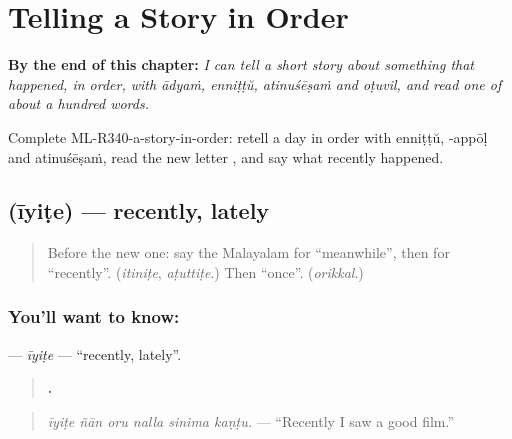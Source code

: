 
\chapter{Telling a Story in Order}
\label{ch:ml-telling-a-story-in-order}

\begin{chapteropening}
\textbf{By the end of this chapter:} \emph{I can tell a short story about something that happened, in order, with ādyaṁ, enniṭṭŭ, atinuśēṣaṁ and oṭuvil, and read one of about a hundred words.}

Complete ML-R340-a-story-in-order: retell a day in order with enniṭṭŭ, -appōḷ and atinuśēṣaṁ, read the new letter , and say what recently happened.
\end{chapteropening}

\section[\texorpdfstring{\ml{ഈയിടെ} (īyiṭe)}{ഈയിടെ (īyiṭe)}]{ (īyiṭe) — recently, lately}

\label{lesson:ML-C340-iyite}



\begin{quote}
Before the new one: say the Malayalam for \textquotedblleft{}meanwhile\textquotedblright{}, then for \textquotedblleft{}recently\textquotedblright{}. (\emph{itiniṭe}, \emph{aṭuttiṭe}.) Then \textquotedblleft{}once\textquotedblright{}. (\emph{orikkal}.)
\end{quote}

\subsection*{You'll want to know: }
\textbf{} — \emph{īyiṭe} — \textquotedblleft{}recently, lately\textquotedblright{}.

\begin{quote}
\textbf{     .}
\end{quote}

\begin{quote}
\emph{īyiṭe ñān oru nalla sinima kaṇṭu.} — \textquotedblleft{}Recently I saw a good film.\textquotedblright{}
\end{quote}

